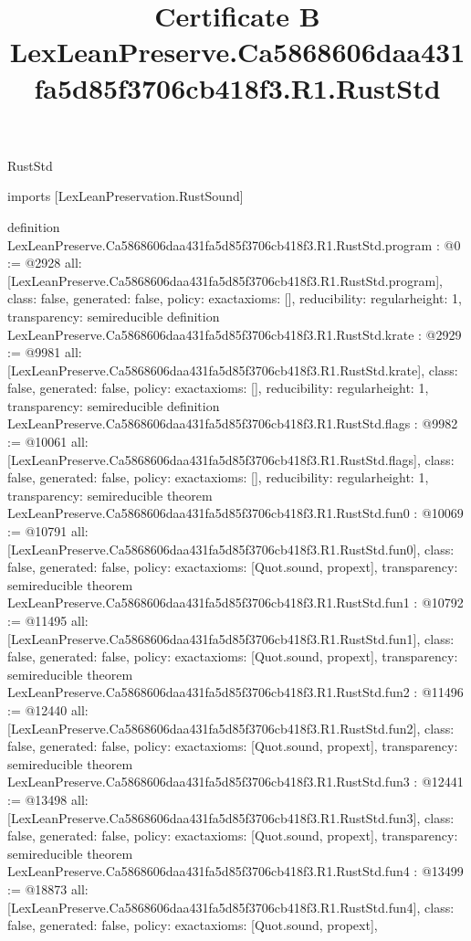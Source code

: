 \begin{lexlean}{RustStd}
\title{Certificate B LexLeanPreserve.Ca5868606daa431fa5d85f3706cb418f3.R1.RustStd}
\begin{coremodule}
imports [LexLeanPreservation.RustSound]

definition LexLeanPreserve.Ca5868606daa431fa5d85f3706cb418f3.R1.RustStd.program : @0 := @2928 {
  all: [LexLeanPreserve.Ca5868606daa431fa5d85f3706cb418f3.R1.RustStd.program],
  class: false,
  generated: false,
  policy: exact{axioms: []},
  reducibility: regular{height: 1},
  transparency: semireducible
}
definition LexLeanPreserve.Ca5868606daa431fa5d85f3706cb418f3.R1.RustStd.krate : @2929 := @9981 {
  all: [LexLeanPreserve.Ca5868606daa431fa5d85f3706cb418f3.R1.RustStd.krate],
  class: false,
  generated: false,
  policy: exact{axioms: []},
  reducibility: regular{height: 1},
  transparency: semireducible
}
definition LexLeanPreserve.Ca5868606daa431fa5d85f3706cb418f3.R1.RustStd.flags : @9982 := @10061 {
  all: [LexLeanPreserve.Ca5868606daa431fa5d85f3706cb418f3.R1.RustStd.flags],
  class: false,
  generated: false,
  policy: exact{axioms: []},
  reducibility: regular{height: 1},
  transparency: semireducible
}
theorem LexLeanPreserve.Ca5868606daa431fa5d85f3706cb418f3.R1.RustStd.fun0 : @10069 := @10791 {
  all: [LexLeanPreserve.Ca5868606daa431fa5d85f3706cb418f3.R1.RustStd.fun0],
  class: false,
  generated: false,
  policy: exact{axioms: [Quot.sound, propext]},
  transparency: semireducible
}
theorem LexLeanPreserve.Ca5868606daa431fa5d85f3706cb418f3.R1.RustStd.fun1 : @10792 := @11495 {
  all: [LexLeanPreserve.Ca5868606daa431fa5d85f3706cb418f3.R1.RustStd.fun1],
  class: false,
  generated: false,
  policy: exact{axioms: [Quot.sound, propext]},
  transparency: semireducible
}
theorem LexLeanPreserve.Ca5868606daa431fa5d85f3706cb418f3.R1.RustStd.fun2 : @11496 := @12440 {
  all: [LexLeanPreserve.Ca5868606daa431fa5d85f3706cb418f3.R1.RustStd.fun2],
  class: false,
  generated: false,
  policy: exact{axioms: [Quot.sound, propext]},
  transparency: semireducible
}
theorem LexLeanPreserve.Ca5868606daa431fa5d85f3706cb418f3.R1.RustStd.fun3 : @12441 := @13498 {
  all: [LexLeanPreserve.Ca5868606daa431fa5d85f3706cb418f3.R1.RustStd.fun3],
  class: false,
  generated: false,
  policy: exact{axioms: [Quot.sound, propext]},
  transparency: semireducible
}
theorem LexLeanPreserve.Ca5868606daa431fa5d85f3706cb418f3.R1.RustStd.fun4 : @13499 := @18873 {
  all: [LexLeanPreserve.Ca5868606daa431fa5d85f3706cb418f3.R1.RustStd.fun4],
  class: false,
  generated: false,
  policy: exact{axioms: [Quot.sound, propext]},
}
\end{coremodule}
\end{lexlean}
